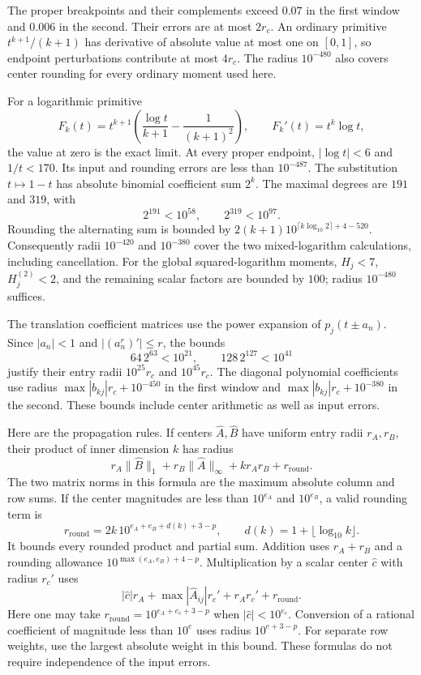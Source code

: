 The proper breakpoints and their complements exceed $0.07$ in
the first window and $0.006$ in the second.  Their errors are at
most $2r_c$.  An ordinary primitive
$t^{k+1}/(k+1)$ has derivative of absolute value at most one
on $[0,1]$, so endpoint perturbations contribute at most $4r_c$.
The radius $10^{-480}$ also covers center rounding for every
ordinary moment used here.

For a logarithmic primitive
\[
 F_k(t)=t^{k+1}\left(\frac{\log t}{k+1}
                              -\frac1{(k+1)^2}\right),
 \qquad F_k'(t)=t^k\log t,
\]
the value at zero is the exact limit.  At every proper endpoint,
$|\log t|<6$ and $1/t<170$.  Its input and rounding errors
are less than $10^{-487}$.  The substitution $t\mapsto1-t$
has absolute binomial coefficient sum $2^k$.  The maximal
degrees are $191$ and $319$, with
\[
 2^{191}<10^{58},\qquad 2^{319}<10^{97}.
\]
Rounding the alternating sum is bounded by
$2(k+1)10^{\lceil k\log_{10}2\rceil+4-520}$.
Consequently radii $10^{-420}$ and $10^{-380}$ cover the two
mixed-logarithm calculations, including cancellation.
For the global squared-logarithm moments, $H_j<7$,
$H_j^{(2)}<2$, and the remaining scalar factors are bounded by
$100$; radius $10^{-480}$ suffices.

The translation coefficient matrices use the power expansion of
$p_j(t\pm a_n)$.  Since $|a_n|<1$ and
$|(a_n^r)'|\le r$, the bounds
\[
 64\,2^{63}<10^{21},\qquad
 128\,2^{127}<10^{41}
\]
justify their entry radii $10^{25}r_c$ and $10^{45}r_c$.
The diagonal polynomial coefficients use radius
$\max|b_{kj}|r_c+10^{-450}$ in the first window and
$\max|b_{kj}|r_c+10^{-380}$ in the second.
These bounds include center arithmetic as well as input errors.

Here are the propagation rules.  If centers $\widehat A,
\widehat B$ have uniform entry radii $r_A,r_B$, their product
of inner dimension $k$ has radius
\begin{equation}
 r_A\|\widehat B\|_1+r_B\|\widehat A\|_\infty
       +kr_Ar_B+r_{\mathrm{round}}.
 \label{eq:window-computation-radius}
\end{equation}
The two matrix norms in this formula are the maximum absolute
column and row sums.  If the center magnitudes are less than
$10^{e_A}$ and $10^{e_B}$, a valid rounding term is
\[
 r_{\mathrm{round}}=
 2k\,10^{e_A+e_B+d(k)+3-p},\qquad
 d(k)=1+\lfloor\log_{10}k\rfloor.
\]
It bounds every rounded product and partial sum.  Addition uses
$r_A+r_B$ and a rounding allowance
$10^{\max(e_A,e_B)+4-p}$.  Multiplication by a scalar center
$\widehat c$ with radius $r_c'$ uses
\[
 |\widehat c|r_A+\max|\widehat A_{ij}|r_c'
                  +r_Ar_c'+r_{\mathrm{round}}.
\]
Here one may take $r_{\mathrm{round}}=10^{e_A+e_c+3-p}$
when $|\widehat c|<10^{e_c}$.  Conversion of a rational
coefficient of magnitude less than $10^e$ uses radius $10^{e+3-p}$.
For separate row weights, use the largest absolute weight in
this bound.  These formulas do not require independence of the
input errors.

